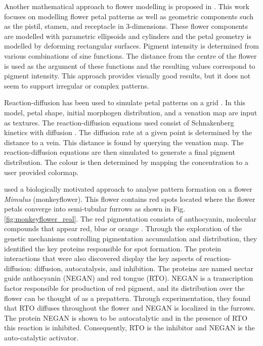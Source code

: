 Another mathematical approach to flower modelling is proposed in \citep{lu2014}. This work focuses on modelling flower petal patterns as well as geometric components such as the pistil, stamen, and receptacle in 3-dimensions. These flower components are modelled with parametric ellipsoids and cylinders and the petal geometry is modelled by deforming rectangular surfaces. Pigment intensity is determined from various combinations of sine functions. The distance from the centre of the flower is used as the argument of these functions and the resulting values correspond to pigment intensity. This approach provides visually good results, but it does not seem to support irregular or complex patterns.

Reaction-diffusion has been used to simulate petal patterns on a grid \citep{zhou2007}. In this model, petal shape, initial morphogen distribution, and a venation map are input as textures. The reaction-diffusion equations used consist of Schnakenberg kinetics with diffusion \citep{schnakenberg1979}. The diffusion rate at a given point is determined by the distance to a vein. This distance is found by querying the venation map. The reaction-diffusion equations are then simulated to generate a final pigment distribution. The colour is then determined by mapping the concentration to a user provided colormap.

\citep{Yuan2019} used a biologically motivated approach to analyse pattern formation on a flower \textit{Mimulus} (monkeyflower). This flower contains red spots located where the flower petals converge into semi-tubular furrows as shown in Fig. \ref{fig:monkeyflower_real}. The red pigmentation consists of anthocyanin, molecular compounds that appear red, blue or orange \citep{bayer1966}. Through the exploration of the genetic mechanisms controlling pigmentation accumulation and distribution, they identified the key proteins responsible for spot formation. The protein interactions that were also discovered display the key aspects of reaction-diffusion: diffusion, autocatalysis, and inhibition. The proteins are named nectar guide anthocyanin (NEGAN) and red tongue (RTO). NEGAN is a transcription factor responsible for production of red pigment, and its distribution over the flower can be thought of as a prepattern. Through experimentation, they found that RTO diffuses throughout the flower and NEGAN is localized in the furrows. The protein NEGAN is shown to be autocatalytic and in the presence of RTO this reaction is inhibited. Consequently, RTO is the inhibitor and NEGAN is the auto-catalytic activator.

